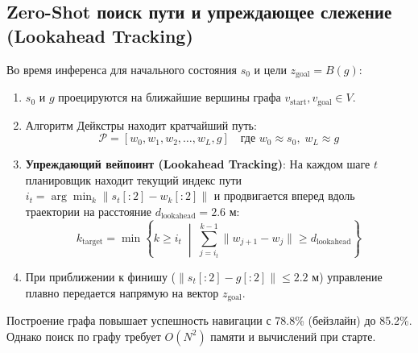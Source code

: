 \subsection{Zero-Shot поиск пути и упреждающее слежение (Lookahead Tracking)}
Во время инференса для начального состояния $s_0$ и цели $z_{\text{goal}} = B(g)$:
\begin{enumerate}[leftmargin=*,noitemsep]
    \item $s_0$ и $g$ проецируются на ближайшие вершины графа $v_{\text{start}}, v_{\text{goal}} \in V$.
    \item Алгоритм Дейкстры находит кратчайший путь:
    \begin{equation}
        \mathcal{P} = [w_0, w_1, w_2, \dots, w_L, g] \quad \text{где } w_0 \approx s_0, \; w_L \approx g
    \end{equation}
    \item \textbf{Упреждающий вейпоинт (Lookahead Tracking)}: На каждом шаге $t$ планировщик находит текущий индекс пути $i_t = \arg\min_k \|s_t[:2] - w_k[:2]\|$ и продвигается вперед вдоль траектории на расстояние $d_{\text{lookahead}} = 2.6\text{ м}$:
    \begin{equation}
        k_{\text{target}} = \min \left\{ k \ge i_t \;\middle|\; \sum_{j=i_t}^{k-1} \|w_{j+1} - w_j\| \ge d_{\text{lookahead}} \right\}
    \end{equation}
    \item При приближении к финишу ($\|s_t[:2] - g[:2]\| \le 2.2\text{ м}$) управление плавно передается напрямую на вектор $z_{\text{goal}}$.
\end{enumerate}
Построение графа повышает успешность навигации с 78.8\% (бейзлайн) до 85.2\%. Однако поиск по графу требует $O(N^2)$ памяти и вычислений при старте.
